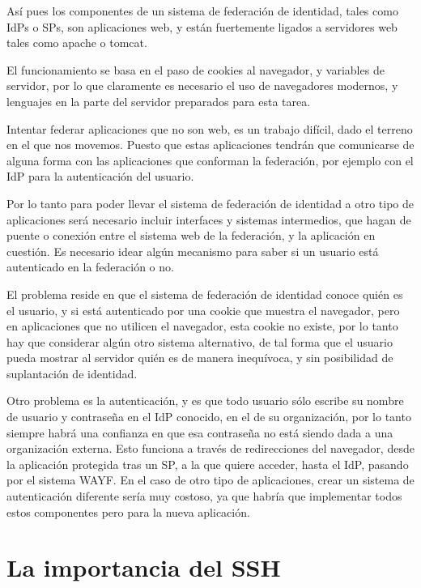     Así pues los componentes de un sistema de federación de identidad,
    tales como IdPs o SPs, son aplicaciones web, y están fuertemente
    ligados a servidores web tales como apache o tomcat.

    El funcionamiento se basa en el paso de cookies al navegador, y
    variables de servidor, por lo que claramente es necesario el uso de
    navegadores modernos, y lenguajes en la parte del servidor preparados
    para esta tarea.

    Intentar federar aplicaciones que no son web, es un trabajo difícil,
    dado el terreno en el que nos movemos. Puesto que estas aplicaciones
    tendrán que comunicarse de alguna forma con las aplicaciones que
    conforman la federación, por ejemplo con el IdP para la autenticación
    del usuario.

    Por lo tanto para poder llevar el sistema de federación de identidad a
    otro tipo de aplicaciones será necesario incluir interfaces y sistemas
    intermedios, que hagan de puente o conexión entre el sistema web de la
    federación, y la aplicación en cuestión. Es necesario idear algún
    mecanismo para saber si un usuario está autenticado en la federación o
    no.

    El problema reside en que el sistema de federación de identidad conoce
    quién es el usuario, y si está autenticado por una cookie que muestra
    el navegador, pero en aplicaciones que no utilicen el navegador, esta
    cookie no existe, por lo tanto hay que considerar algún otro sistema
    alternativo, de tal forma que el usuario pueda mostrar al servidor
    quién es de manera inequívoca, y sin posibilidad de suplantación de
    identidad.


    Otro problema es la autenticación, y es que todo usuario sólo escribe
    su nombre de usuario y contraseña en el IdP conocido, en el de su
    organización, por lo tanto siempre habrá una confianza en que esa
    contraseña no está siendo dada a una organización externa. Esto
    funciona a través de redirecciones del navegador, desde la aplicación
    protegida tras un SP, a la que quiere acceder, hasta el IdP, pasando
    por el sistema WAYF. En el caso de otro tipo de aplicaciones, crear un
    sistema de autenticación diferente sería muy costoso, ya que habría que
    implementar todos estos componentes pero para la nueva aplicación.

    \section{La importancia del SSH}

